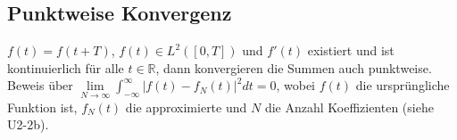 \subsection{Punktweise Konvergenz}
$f(t) = f(t+T)$, $f(t) \in L^2([0,T])$ und $f'(t)$ existiert und ist kontinuierlich für alle $t \in \mathbb{R}$, dann konvergieren die Summen auch punktweise. Beweis über $\lim\limits_{N \rightarrow \infty} \int_{-\infty}^{\infty} | f(t) - f_N(t) |^2 dt = 0$, wobei $f(t)$ die ursprüngliche Funktion ist, $f_N(t)$ die approximierte und $N$ die Anzahl Koeffizienten (siehe U2-2b).
